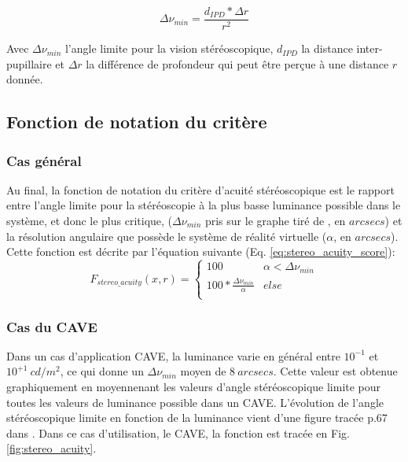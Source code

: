 	\begin{equation}	
		\Delta \nu_{min} = \frac{d_{IPD} * \Delta r}{r^2}
		\label{eq:limiting_angle}
	\end{equation}
	
	\par Avec $\Delta \nu_{min}$ l'angle limite pour la vision stéréoscopique, $d_{IPD}$ la distance inter-pupillaire et $\Delta r$ la différence de profondeur qui peut être perçue à une distance $r$ donnée.
	
	\subsection{Fonction de notation du critère}

	\subsubsection{Cas général}	
	\par Au final, la fonction de notation du critère d'acuité stéréoscopique est le rapport entre l'angle limite pour la stéréoscopie à la plus basse luminance possible dans le système, et donc le plus critique, ($\Delta \nu_{min}$ pris sur le graphe tiré de  \citep{gross_human_2008}, en $arcsecs$) et la résolution angulaire que possède le système de réalité virtuelle ($\alpha$, en $arcsecs$). Cette fonction est décrite par l'équation suivante (Eq. \ref{eq:stereo_acuity_score}):
	\begin{equation}
		F_{stereo\_acuity}(x,r) = \begin{cases}
		100 & \alpha < \Delta \nu_{min}\\
		100 * \frac{\Delta \nu_{min}}{\alpha} & else\\
		\end{cases}
		\label{eq:stereo_acuity_score}
	\end{equation}
	
	\subsubsection{Cas du CAVE}	
	\par Dans un cas d'application CAVE, la luminance varie en général entre $10^{-1}$ et $10^{+1}~cd/m^2$, ce qui donne un $\Delta \nu_{min}$ moyen de $8~arcsecs$. Cette valeur est obtenue graphiquement en moyennenant les valeurs d'angle stéréoscopique limite pour toutes les valeurs de luminance possible dans un CAVE. L'évolution de l'angle stéréoscopique limite en fonction de la luminance vient d'une figure tracée p.67 dans \citep{gross_human_2008}. Dans ce cas d'utilisation, le CAVE, la fonction est tracée en Fig. \ref{fig:stereo_acuity}.
	
